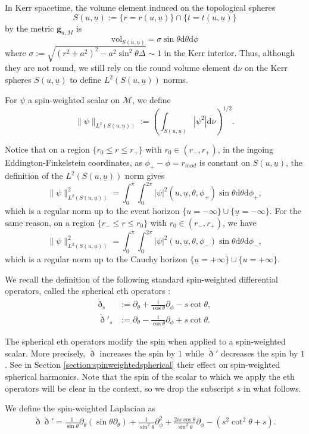 \documentclass[reqno]{amsart}
\numberwithin{equation}{section}
\newcommand{\mcm}{\mathcal{M}}
\newcommand{\ubar}{{\underline{u}}}
\newcommand{\dee}{\mathrm{d}}
\newcommand{\drond}{\mathring{\eth}}
\theoremstyle{plain}
\theoremstyle{definition}
\theoremstyle{remark}
\numberwithin{equation}{section}
\begin{document}
In Kerr spacetime, the volume element induced on the topological spheres 
$$S(u,\ubar):=\{r=r(u,\ubar)\}\cap\{t=t(u,\ubar)\}$$
by the metric $\mathbf{g}_{a,M}$ is 
$$\mathrm{vol}_{S(u,\ubar)}=\sigma\sin\theta\dee\theta\dee\phi$$
where {$\sigma:=\sqrt{(r^2+a^2)^2-a^2\sin^2\theta\Delta}\sim 1$} in the Kerr interior. Thus, although they are not round, we still rely on the round volume element $\dee\nu$ on the Kerr spheres $S(u,\ubar)$ to define $L^2(S(u,\ubar))$ norms. 
\begin{defi}
    For $\psi$ a spin-weighted scalar on $\mcm$, we define
$$\|\psi\|_{L^2(S(u,\ubar))}:=\left(\int_{S(u,\ubar)}|\psi^2|\dee\nu\right)^{1/2}.$$
\end{defi}
Notice that on a region $\{r_0\leq r\leq r_+\}$ with $r_0\in(r_-,r_+)$, in the ingoing Eddington-Finkelstein coordinates, as $\phi_+-\phi=r_{mod}$ is constant on $S(u,\ubar)$, the definition of the $L^2(S(u,\ubar))$ norm gives 
$$\|\psi\|_{L^2(S(u,\ubar))}^2=\int_0^\pi\int_0^{2\pi}|\psi|^2(u,\ubar,\theta,\phi_+)\sin\theta\dee\theta\dee\phi_+,$$
which is a regular norm up to the event horizon $\{u=-\infty\}\cup\{\ubar=-\infty\}$. For the same reason, on a region $\{r_-\leq r\leq r_0\}$ with $r_0\in(r_-,r_+)$, we have 
$$\|\psi\|_{L^2(S(u,\ubar))}^2=\int_0^\pi\int_0^{2\pi}|\psi|^2(u,\ubar,\theta,\phi_-)\sin\theta\dee\theta\dee\phi_-,$$
which is a regular norm up to the Cauchy horizon $\{\ubar=+\infty\}\cup\{u=+\infty\}$.
\begin{defi}
    We recall the definition of the following standard spin-weighted differential operators, called the spherical eth operators :
    \begin{align}
        \drond_s&:=\partial_\theta+\frac{i}{\cos\theta}\partial_\phi-s\cot\theta,\\
        \drond'_s&:=\partial_\theta-\frac{i}{\cos\theta}\partial_\phi+s\cot\theta.
    \end{align}
\end{defi}
\begin{rem}
    The spherical eth operators modify the spin when applied to a spin-weighted scalar. More precisely, $\drond$ increases the spin by $1$ while $\drond'$ decreases the spin by $1$. See in Section \ref{section:spinweightedspherical} their effect on spin-weighted spherical harmonics. Note that the spin of the scalar to which we apply the eth operators will be clear in the context, so we drop the subscript $s$ in what follows. 
\end{rem}
\begin{defi}
    We define the spin-weighted Laplacian as
    \begin{align}
        \drond\drond'=\frac{1}{\sin\theta}\partial_\theta(\sin\theta\partial_\theta)+\frac{1}{\sin^2\theta}\partial_\phi^2+\frac{2is\cos\theta}{\sin^2\theta}\partial_\phi-(s^2\cot^2\theta+s).
    \end{align}
\end{defi}
\end{document}
